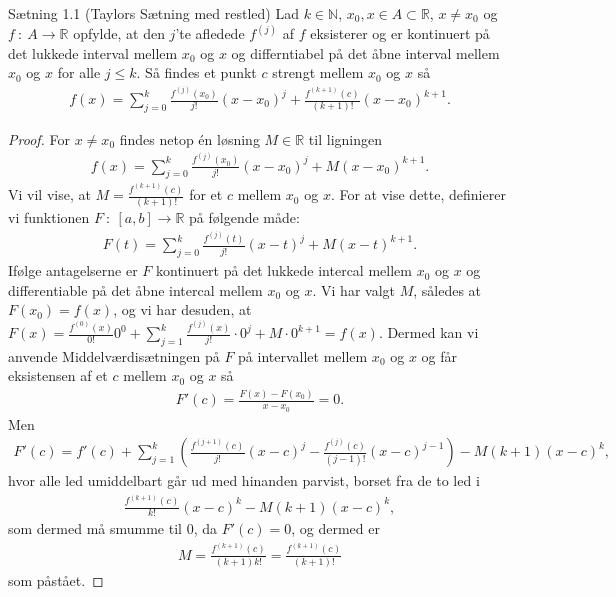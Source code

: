 \begin{boks}{Sætning 1.1 (Taylors Sætning med restled)}
  Lad $k \in \mathbb{N}$, $x_0, x \in A \subset \mathbb{R}$, $x \neq x_0$ og $f \ : \ A \rightarrow \mathbb{R}$ opfylde, at den $j$'te afledede $f^{(j)}$ af $f$ eksisterer og er kontinuert på det lukkede interval mellem $x_0$ og $x$ og differntiabel på det åbne interval mellem $x_0$ og $x$ for alle $j \leq k$.
  Så findes et punkt $c$ strengt mellem $x_0$ og $x$ så
  \begin{align}\label{(1)}
    f(x) = \sum_{j = 0}^k \frac{f^{(j)}(x_0)}{j!}(x - x_0)^j + \frac{f^{(k + 1)}(c)}{(k + 1)!}(x - x_0)^{k + 1}.
  \end{align}
\end{boks}
\begin{proof}
  For $x \neq x_0$ findes netop én løsning $M \in \mathbb{R}$ til ligningen
  \begin{align*}
    f(x) = \sum_{j = 0}^k\frac{f^{(j)}(x_0)}{j!}(x - x_0)^j + M(x - x_0)^{k + 1}.
  \end{align*}
  Vi vil vise, at $M = \frac{f^{(k + 1)}(c)}{(k + 1)!}$ for et $c$ mellem $x_0$ og $x$. For at vise dette, definierer vi funktionen $F \ : \ [a,b] \rightarrow \mathbb{R}$ på følgende måde:
  \begin{align*}
    F(t) = \sum_{j = 0}^k \frac{f^{(j)}(t)}{j!}(x - t)^j + M(x - t)^{k + 1}.
  \end{align*}
Ifølge antagelserne er $F$ kontinuert på det lukkede intercal mellem $x_0$ og $x$ og differentiable på det åbne intercal mellem $x_0$ og $x$.
Vi har valgt $M$, således at $F(x_0) = f(x)$, og vi har desuden, at $F(x) = \frac{f^{(0)}(x)}{0!}0^0 + \sum_{j = 1}^k \frac{f^{(j)}(x)}{j!} \cdot 0^j + M \cdot 0^{k + 1} = f(x)$. Dermed kan vi anvende Middelværdisætningen på $F$ på intervallet mellem $x_0$ og $x$ og får eksistensen af et $c$ mellem $x_0$ og $x$ så
\begin{align*}
  F'(c) = \frac{F(x) - F(x_0)}{x - x_0} = 0.
\end{align*}
Men
\begin{align*}
  F'(c) = f'(c) + \sum_{j = 1}^k \left( \frac{f^{(j + 1)}(c)}{j!}(x - c)^j -
  \frac{f^{(j)}(c)}{(j - 1)!}(x - c)^{j - 1} \right) -
  M(k + 1)(x - c)^k,
\end{align*}
hvor alle led umiddelbart går ud med hinanden parvist, borset fra de to led i
\begin{align*}
  \frac{f^{(k + 1)}(c)}{k!}(x - c)^k - M(k + 1)(x - c)^k,
\end{align*}
som dermed må smumme til $0$, da $F'(c) = 0$, og dermed er
\begin{align*}
  M = \frac{f^{(k + 1)}(c)}{(k + 1)k!} = \frac{f^{(k + 1)}(c)}{(k + 1)!}
\end{align*}
som påstået.
\end{proof}

